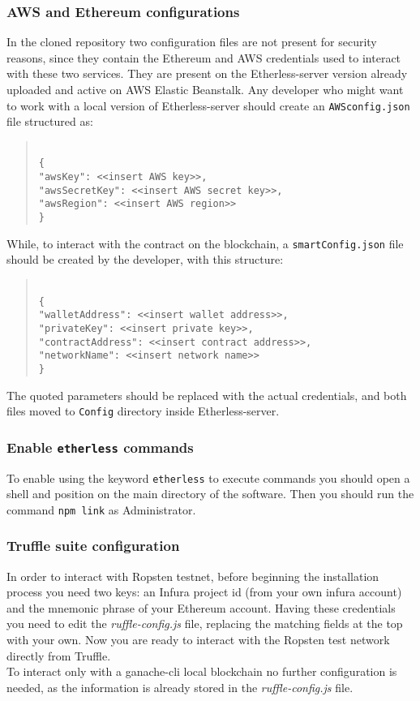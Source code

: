 \subsubsection{AWS and Ethereum configurations}
In the cloned repository two configuration files are not present for security reasons, since they contain the Ethereum and AWS credentials used to interact with these two services. They are present on the Etherless-server version already uploaded and active on AWS Elastic Beanstalk.
Any developer who might want to work with a local version of Etherless-server should create an \texttt{AWSconfig.json} file structured as:
\begin{quote}
\texttt{ \\
	\{\\
		"awsKey": <<insert AWS key>>, \\
		"awsSecretKey": <<insert AWS secret key>>, \\
		"awsRegion": <<insert AWS region>> \\
	\}\\
}
\end{quote}
While, to interact with the contract on the blockchain, a \texttt{smartConfig.json} file should be created by the developer, with this structure:
\begin{quote}
\texttt{ \\
	\{\\
	"walletAddress": <<insert wallet address>>, \\
	"privateKey": <<insert private key>>, \\
	"contractAddress": <<insert contract address>>, \\
	"networkName": <<insert network name>> \\
	\}\\
}
\end{quote}
The quoted parameters should be replaced with the actual credentials, and both files moved to \texttt{Config} directory inside Etherless-server.
\subsubsection{Enable \texttt{etherless} commands}
To enable using the keyword \texttt{etherless} to execute commands you should open a shell and position on the main directory of the software.
Then you should run the command \texttt{npm link} as Administrator.
\subsubsection{Truffle suite configuration}
	In order to interact with Ropsten testnet, before beginning the installation process you need two keys: an Infura project id (from your own infura account) and the mnemonic phrase of your Ethereum account. Having these credentials you need to edit the \textit{ruffle-config.js} file, replacing the matching fields at the top with your own. Now you are ready to interact with the Ropsten test network directly from Truffle.\\
	To interact only with a ganache-cli local blockchain no further configuration is needed, as the information is already stored in the \textit{ruffle-config.js} file.
